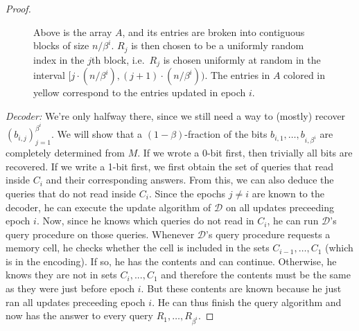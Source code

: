 \documentclass[11pt]{article}
\begin{document}
\begin{proof}
\begin{figure}
\begin{center}
\end{center}
\caption{Above is the array $A$, and its entries are broken into contiguous blocks of size $n/\beta^i$. $R_j$ is then chosen to be a uniformly random index in the $j$th block, i.e.\ $R_j$ is chosen uniformly at random in the interval $[j\cdot (n/\beta^i), (j+1)\cdot (n/\beta^i))$. The entries in $A$ colored in yellow correspond to the entries updated in epoch $i$.}\label{fig:epochs}
\end{figure}

\emph{Decoder:} We're only halfway there, since we still need a way to (mostly) recover $(b_{i,j})_{j=1}^{\beta^i}$. We will show that a $(1-\beta)$-fraction of the bits $b_{i,1},\dots,b_{i,\beta^i}$ are completely determined from $M$. If we wrote a 0-bit first, then trivially all bits are recovered. If we write a 1-bit first, we first obtain the set of queries that read inside $C_i$ and their corresponding answers. From this, we can also deduce the queries that do not read inside $C_i$. Since the epochs $j\neq i$ are known to the decoder, he can execute the update algorithm of $\mathcal D$ on all updates preceeding epoch $i$. Now, since he knows which queries do not read in $C_i$, he can run $\mathcal D$'s query procedure on those queries. Whenever $\mathcal D$'s query procedure requests a memory cell, he checks whether the cell is included in the sets $C_{i-1},\ldots,C_{1}$ (which is in the encoding). If so, he has the contents and can continue.  Otherwise, he knows they are not in sets $C_i,...,C_1$ and therefore the contents must be the same as they were just before epoch $i$. But these contents are known because he just ran all updates preceeding epoch $i$. He can thus finish the query algorithm and now has the answer to every query $R_1,\ldots,R_{\beta^i}$. 


\end{proof}
\end{document}
